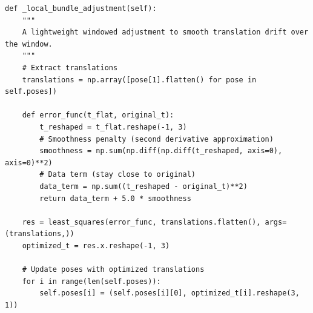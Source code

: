 \documentclass[12pt]{article}
\begin{document}
\begin{verbatim}
def _local_bundle_adjustment(self):
    """
    A lightweight windowed adjustment to smooth translation drift over the window.
    """
    # Extract translations
    translations = np.array([pose[1].flatten() for pose in self.poses])
    
    def error_func(t_flat, original_t):
        t_reshaped = t_flat.reshape(-1, 3)
        # Smoothness penalty (second derivative approximation)
        smoothness = np.sum(np.diff(np.diff(t_reshaped, axis=0), axis=0)**2)
        # Data term (stay close to original)
        data_term = np.sum((t_reshaped - original_t)**2)
        return data_term + 5.0 * smoothness
        
    res = least_squares(error_func, translations.flatten(), args=(translations,))
    optimized_t = res.x.reshape(-1, 3)
    
    # Update poses with optimized translations
    for i in range(len(self.poses)):
        self.poses[i] = (self.poses[i][0], optimized_t[i].reshape(3, 1))
\end{verbatim}
\end{document}
